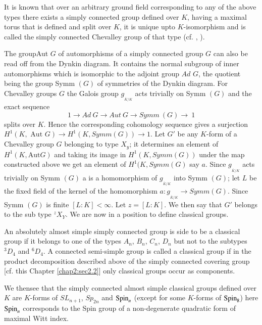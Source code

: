 It is known that over an arbitrary ground field corresponding to any
of the above types there exists a simply connected group defined over
$K$, having a maximal torus that is defined and split over $K$, it is
unique upto $K$-isomorphism and is called the simply connected
Chevalley group of that  type (cf. \cite{keyC2}, \cite{keyD-G}).   

 The group\pageoriginale Aut $G$ of automorphisms of a simply
 connected group $G$ can 
 also be read off from the Dynkin diagram. It contains the normal
 subgroup of inner automorphisms which is isomorphic to the adjoint
 group $Ad$ $G$, the quotient being the group Symm $(G)$ of
 symmetries of the Dynkin diagram. For Chevalley groups $G$ the Galois
 group $g_{_{\bar{K}/K}}$ acts trivially on Symm $(G)$ and the exact
 sequence  
\begin{equation*}
1 \longrightarrow Ad~ G \longrightarrow Aut~ G \longrightarrow Symm~
(G) \longrightarrow ~1 \tag*{($\ast$)}\label{c2:eqast}
\end{equation*}
splits over $K$. Hence the corresponding cohomology sequence gives a
surjection $ H^1 (K, \text{ Aut } G) \longrightarrow H^1 (K, Symm
(G)) \longrightarrow 1$. Let $G'$ be any $K$-form of a Chevalley group
$G$ belonging to type $X_y$; it determines an element of  $H^1 (K,
\text{Aut} G)$ and taking its image in  $H^1 (K, Symm (G))$ under the
map constructed above we get an element of $H^1 (K, Symm (G)$ say
$a$. Since $ g_{_{\bar{K}/K}}$ acts trivially on Symm $(G)$ a is a
homomorphism of $g_{_{\bar{K}/K}}$ into Symm $(G)$; let $L$ be the
fixed field of the kernel of the homomorphism $a
:g_{_{\bar{K}/K}}\longrightarrow Symm (G)$. Since  Symm $(G)$ is
finite $[L :K ] < \infty$. Let $z =  [L :K ]$. We then say that $G'$
belongs to the sub type ${}^z X_{Y}$. We are now in a position to
define classical groups.  

\begin{defi*}
An absolutely almost simple simply connected group is side  to be a
classical group if it belongs to one of the types  $A_n$, $B_n$, $C_n$,
$D_n$ but not to the subtypes ${}^3 D_4$ and  ${}^6 D_4$. A connected
semi-simple group is called a classical group if in the product
decomposition described above of the simply connected covering group
[cf. this Chapter \ref{chap2:sec2.2}] only classical groups occur
as components.  
\end{defi*}

 We then\pageoriginale see that the simply connected almost simple
 classical grou\-ps 
 defined over $K$ are $K$-forms of $SL_{n+1}$, $Sp_{2n} $ and $\operatorname{Spin}_n$
 (except for some $K$-forms of $\operatorname{Spin}_8$) here $\operatorname{Spin}_n$  corresponds to
 the Spin group of a non-degenerate quadratic form of maximal Witt
 index.  
 

